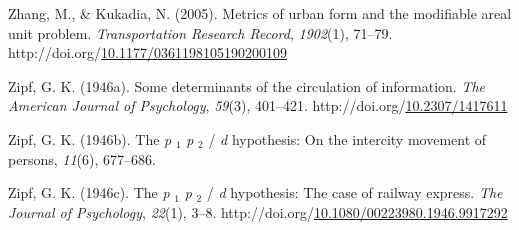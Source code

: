 \documentclass[
11pt, %
oneside, %
english, %
singlespacing, %
]{macthesis} %
\newlength{\cslhangindent}
\newenvironment{CSLReferences}[2] %
{\begin{list}{}{%
	\setlength{\itemindent}{0pt}
	\setlength{\leftmargin}{0pt}
	\setlength{\parsep}{0pt}
	\ifodd #1
	\setlength{\leftmargin}{\cslhangindent}
	\setlength{\itemindent}{-1\cslhangindent}
	\fi
	\setlength{\itemsep}{#2\baselineskip}}}
{\end{list}}
\begin{document}
\begin{CSLReferences}{1}{0}
Zhang, M., \& Kukadia, N. (2005). Metrics of urban form and the modifiable areal unit problem. \emph{Transportation Research Record}, \emph{1902}(1), 71--79. http://doi.org/\href{https://doi.org/10.1177/0361198105190200109}{10.1177/0361198105190200109}

Zipf, G. K. (1946a). Some determinants of the circulation of information. \emph{The American Journal of Psychology}, \emph{59}(3), 401--421. http://doi.org/\href{https://doi.org/10.2307/1417611}{10.2307/1417611}

Zipf, G. K. (1946b). The \emph{p} \(_{\textrm{1}}\) \emph{p} \(_{\textrm{2}}\) / \emph{d} hypothesis: On the intercity movement of persons, \emph{11}(6), 677--686.

Zipf, G. K. (1946c). The \emph{p} \(_{\textrm{1}}\) \emph{p} \(_{\textrm{2}}\) / \emph{d} hypothesis: The case of railway express. \emph{The Journal of Psychology}, \emph{22}(1), 3--8. http://doi.org/\href{https://doi.org/10.1080/00223980.1946.9917292}{10.1080/00223980.1946.9917292}

\end{CSLReferences}
\end{document}
